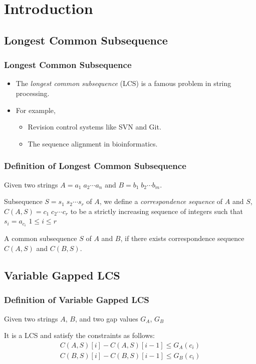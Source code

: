 \section{Introduction}

\subsection{Longest Common Subsequence}
\begin{frame}
    \frametitle{Longest Common Subsequence}
    \begin{itemize}
        \setlength\itemsep{1em}
        \item 
            The {\em longest common subsequence} (LCS) is a famous
            problem in string processing.
        \item 
            For example, 
            \begin{itemize}
                \setlength\itemsep{1em}
                \item 
                    Revision control systems like SVN and Git.
                \item 
                    The sequence alignment in bioinformatics.
            \end{itemize}
    \end{itemize}
\end{frame}

\begin{frame}
    \frametitle{Definition of Longest Common Subsequence}
    Given two strings $A = a_1 \; a_2 \cdots a_n$ and $B = b_1 \; b_2
    \cdots b_m$.
    \begin{definition}
        Subsequence $S = s_1 \; s_2 \cdots s_r$ of $A$, we define a
        \emph{correspondence sequence} of $A$ and $S$, $C(A, S) = c_1 \;
        c_2 \cdots c_r$ to be a strictly increasing sequence of integers
        such that $s_i = a_{c_i}$ $1 \le i \le r$
	\end{definition}
	\begin{definition}
        A common subsequence $S$ of $A$ and $B$, if there exists
        correspondence sequence $C(A, S)$ and $C(B, S)$.
	\end{definition}
\end{frame}

\subsection{Variable Gapped LCS}
\begin{frame}
    \frametitle{Definition of Variable Gapped LCS}
    Given two strings $A$, $B$, and two gap values $G_{A}$, $G_{B}$
    \begin{definition}
        It is a LCS and satisfy the constraints as follows:
        \begin{align*}
            C(A, S)[i] - C(A, S)[i-1] \le G_{A}(c_i) \\
            C(B, S)[i] - C(B, S)[i-1] \le G_{B}(c_i)
        \end{align*}
    \end{definition}
\end{frame}


